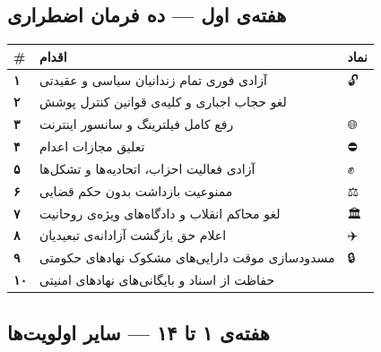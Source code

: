 \documentclass[a4paper,11pt]{article}
\begin{document}
\subsection{هفته‌ی اول — ده فرمان اضطراری}

\begin{alertbox}[title={🔴 فرمان‌های اضطراری — بلافاصله پس از تشکیل مجلس}]
\begin{center}
\begin{tabularx}{\textwidth}{>{\centering\bfseries\small}p{0.5cm} >{\small}X >{\centering\small}p{1cm}}
\rowcolor{mahestan-red!15}
\textcolor{mahestan-red}{\#} & \textcolor{mahestan-red}{\bfseries اقدام} & \textcolor{mahestan-red}{\bfseries نماد} \\
\midrule
۱ & آزادی فوری تمام زندانیان سیاسی و عقیدتی & 🔓 \\
\rowcolor{bg-light-red}
۲ & لغو حجاب اجباری و کلیه‌ی قوانین کنترل پوشش & 👗 \\
۳ & رفع کامل فیلترینگ و سانسور اینترنت & 🌐 \\
\rowcolor{bg-light-red}
۴ & تعلیق مجازات اعدام & ⛔ \\
۵ & آزادی فعالیت احزاب، اتحادیه‌ها و تشکل‌ها & ✊ \\
\rowcolor{bg-light-red}
۶ & ممنوعیت بازداشت بدون حکم قضایی & ⚖️ \\
۷ & لغو محاکم انقلاب و دادگاه‌های ویژه‌ی روحانیت & 🏛️ \\
\rowcolor{bg-light-red}
۸ & اعلام حق بازگشت آزادانه‌ی تبعیدیان & ✈️ \\
۹ & مسدودسازی موقت دارایی‌های مشکوک نهادهای حکومتی & 🔒 \\
\rowcolor{bg-light-red}
۱۰ & حفاظت از اسناد و بایگانی‌های نهادهای امنیتی & 📁 \\
\end{tabularx}
\end{center}
\end{alertbox}

\subsection{هفته‌ی ۱ تا ۱۴ — سایر اولویت‌ها}
\end{document}
